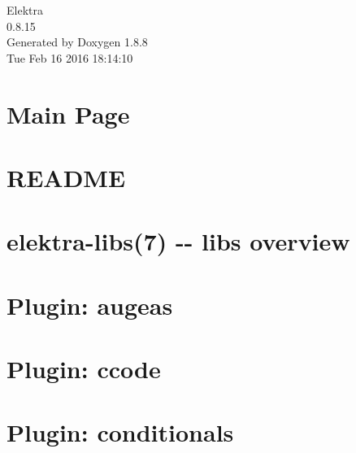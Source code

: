 \documentclass[twoside]{book}
\newcommand{\+}{\discretionary{\mbox{\scriptsize$\hookleftarrow$}}{}{}}
\newcommand{\clearemptydoublepage}{%
  \newpage{\pagestyle{empty}\cleardoublepage}%
}
\begin{document}
\hypersetup{pageanchor=false,
             bookmarks=true,
             bookmarksnumbered=true,
             pdfencoding=unicode
            }
\begin{titlepage}
\vspace*{7cm}
\begin{center}%
{\Large Elektra \\[1ex]\large 0.\+8.\+15 }\\
\vspace*{1cm}
{\large Generated by Doxygen 1.8.8}\\
\vspace*{0.5cm}
{\small Tue Feb 16 2016 18:14:10}\\
\end{center}
\end{titlepage}
\clearemptydoublepage
\tableofcontents
\clearemptydoublepage
{}
\hypersetup{pageanchor=true}

\chapter{Main Page}
\label{index}\hypertarget{index}{}
\chapter{R\+E\+A\+D\+M\+E}
\label{md_src_libs_getenv_README}
\hypertarget{md_src_libs_getenv_README}{}

\chapter{elektra-\/libs(7) -\/-\/ libs overview}
\label{md_src_libs_README}
\hypertarget{md_src_libs_README}{}

\chapter{Plugin\+: augeas}
\label{md_src_plugins_augeas_README}
\hypertarget{md_src_plugins_augeas_README}{}

\chapter{Plugin\+: ccode}
\label{md_src_plugins_ccode_README}
\hypertarget{md_src_plugins_ccode_README}{}

\chapter{Plugin\+: conditionals}
\label{md_src_plugins_conditionals_README}
\hypertarget{md_src_plugins_conditionals_README}{}

\end{document}
